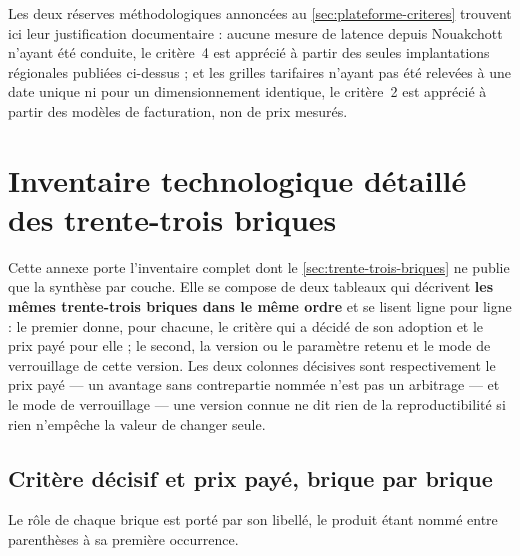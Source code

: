 Les deux réserves méthodologiques annoncées au \cref{sec:plateforme-criteres} trouvent ici leur
justification documentaire : aucune mesure de latence depuis Nouakchott n'ayant été conduite, le
critère~4 est apprécié à partir des seules implantations régionales publiées ci-dessus ; et les
grilles tarifaires n'ayant pas été relevées à une date unique ni pour un dimensionnement identique,
le critère~2 est apprécié à partir des modèles de facturation, non de prix mesurés.

\section{Inventaire technologique détaillé des trente-trois briques}
\label{ann:fiche-versions}

Cette annexe porte l'inventaire complet dont le \cref{sec:trente-trois-briques} ne publie que la
synthèse par couche. Elle se compose de deux tableaux qui décrivent \textbf{les mêmes
trente-trois briques dans le même ordre} et se lisent ligne pour ligne : le premier donne, pour
chacune, le critère qui a décidé de son adoption et le prix payé pour elle ; le second, la version
ou le paramètre retenu et le mode de verrouillage de cette version. Les deux colonnes décisives
sont respectivement le prix payé --- un avantage sans contrepartie nommée n'est pas un arbitrage
--- et le mode de verrouillage --- une version connue ne dit rien de la reproductibilité si rien
n'empêche la valeur de changer seule.

\subsection{Critère décisif et prix payé, brique par brique}
\label{ann:briques-detail}

Le rôle de chaque brique est porté par son libellé, le produit étant nommé entre parenthèses à sa
première occurrence.

